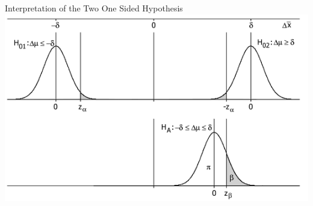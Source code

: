 \begin{frame}{Interpretation of the Two One Sided Hypothesis}
\centering\includegraphics[width=.9\textwidth]{../img/TOST-errors.png}
\end{frame}


%


